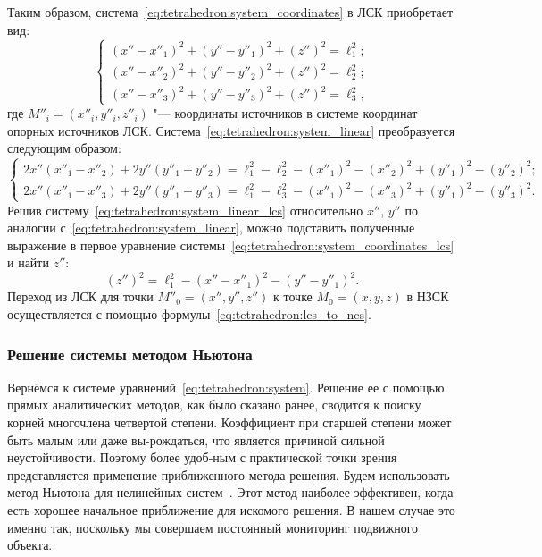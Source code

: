 \documentclass[../main.tex]{subfiles}
\begin{document}
Таким образом, система~\eqref{eq:tetrahedron:system_coordinates} в ЛСК приобретает вид:
\begin{equation}\label{eq:tetrahedron:system_coordinates_lcs}
  \begin{cases}
    \left(x'' - x''_1\right)^2 + \left(y'' - y''_1\right)^2 + \left(z''\right)^2 = \ell_1^2; \\
    \left(x'' - x''_2\right)^2 + \left(y'' - y''_2\right)^2 + \left(z''\right)^2 = \ell_2^2; \\
    \left(x'' - x''_3\right)^2 + \left(y'' - y''_3\right)^2 + \left(z''\right)^2 = \ell_3^2,
  \end{cases}
\end{equation}
где $M''_i = \left(x''_i, y''_i, z''_i\right)$ "--- координаты источников в системе координат опорных источников ЛСК. Система~\eqref{eq:tetrahedron:system_linear} преобразуется следующим образом:
\begin{equation}\label{eq:tetrahedron:system_linear_lcs}
  \begin{cases}
    2 x'' \left(x''_1 - x''_2\right) + 2 y'' \left(y''_1 - y''_2\right) = \ell_1^2 - \ell_2^2 - \left(x''_1\right)^2 - \left(x''_2\right)^2 + \left(y''_1\right)^2 - \left(y''_2\right)^2; \\
    2 x'' \left(x''_1 - x''_3\right) + 2 y'' \left(y''_1 - y''_3\right) = \ell_1^2 - \ell_3^2 - \left(x''_1\right)^2 - \left(x''_3\right)^2 + \left(y''_1\right)^2 - \left(y''_3\right)^2.
  \end{cases}
\end{equation}
Решив систему~\eqref{eq:tetrahedron:system_linear_lcs} относительно $x''$, $y''$ по аналогии с~\eqref{eq:tetrahedron:system_linear}, можно подставить полученные выражение в первое уравнение системы~\eqref{eq:tetrahedron:system_coordinates_lcs} и найти $z''$:
\begin{equation*}
  \left(z''\right)^2 = \ell_1^2 - \left(x'' - x''_1\right)^2 - \left(y'' - y''_1\right)^2.
\end{equation*}
Переход из ЛСК для точки $M''_0 = \left(x'', y'', z''\right)$ к точке $M_0 = \left(x, y, z\right)$ в НЗСК осуществляется с помощью формулы~\eqref{eq:tetrahedron:lcs_to_ncs}.

\subsubsection{Решение системы методом Ньютона}
Вернёмся к системе уравнений~\eqref{eq:tetrahedron:system}. Решение ее с помощью прямых аналитических методов, как было сказано ранее, сводится к поиску корней многочлена четвертой степени. Коэффициент при старшей степени может быть малым или даже вы-рождаться, что является причиной сильной неустойчивости. Поэтому более удоб-ным с практической точки зрения представляется применение приближенного метода решения. Будем использовать метод Ньютона для нелинейных систем~\cite{20, глава 6}.  Этот метод наиболее эффективен, когда есть хорошее начальное приближение для искомого решения. В нашем случае это именно так, поскольку мы совершаем постоянный мониторинг подвижного объекта.
\end{document}
